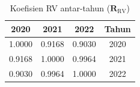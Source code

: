 \begin{table}[H]
\centering
\caption{Koefisien RV antar-tahun ($\mathbf{R}_{\mathrm{RV}}$)} \label{tab:rv}
\begin{tabular}{|c|c|c|c|}
\hline
\textbf{2020} & \textbf{2021} & \textbf{2022} & \textbf{Tahun} \\
\hline
1.0000 & 0.9168 & 0.9030 & 2020 \\
0.9168 & 1.0000 & 0.9964 & 2021 \\
0.9030 & 0.9964 & 1.0000 & 2022 \\
\hline
\end{tabular}
\end{table}